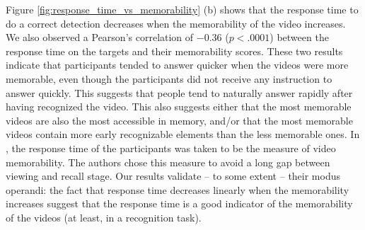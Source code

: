 \documentclass[sigconf]{acmart}
\begin{document}
Figure \ref{fig:response_time_vs_memorability} (b) shows that the response time to do a correct detection decreases when the memorability of the video increases.
We also observed a Pearson's correlation of $-0.36$ ($p<.0001$) between the response time on the targets and their memorability scores.
These two results indicate that participants tended to answer quicker when the videos were more memorable, even though the participants did not receive any instruction to answer quickly.
This suggests that people tend to naturally answer rapidly after having recognized the video.
This also suggests either that the most memorable videos are also the most accessible in memory, and/or that the most memorable videos contain more early recognizable elements than the less memorable ones.
In \cite{shekhar_2017_show}, the response time of the participants was taken to be the measure of video memorability.
The authors chose this measure to avoid a long gap between viewing and recall stage.
Our results validate -- to some extent -- their modus operandi: the fact that response time decreases linearly when the memorability increases suggest that the response time is a good indicator of the memorability of the videos (at least, in a recognition task). 
\end{document}
